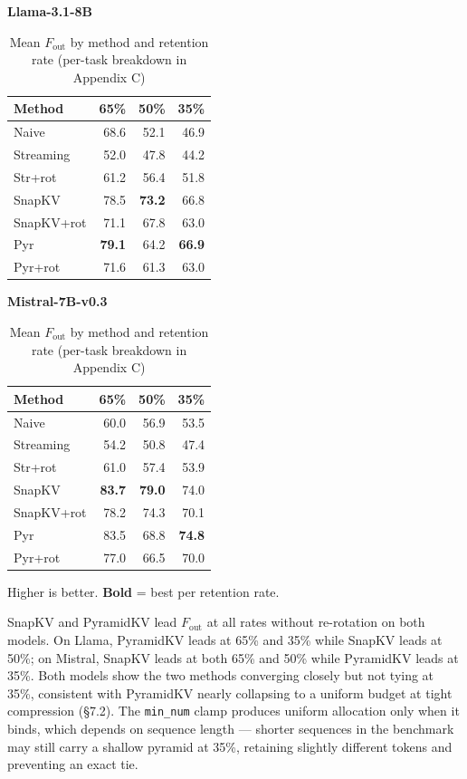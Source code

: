 \documentclass[10pt,letterpaper]{article}
\begin{document}
\begin{table}[H]
\centering
\small
\captionsetup{justification=centering}
\caption{Mean \(F_{\text{out}}\) by method and retention rate (per-task breakdown in Appendix C)}
\label{tab:t4}
\begin{minipage}[t]{0.49\textwidth}
\centering
\textbf{Llama-3.1-8B}\\[0.4em]
\begin{tabular}{@{}lrrr@{}}
\toprule
Method & 65\% & 50\% & 35\%\\
\midrule
Naive      & 68.6 & 52.1 & 46.9\\
Streaming  & 52.0 & 47.8 & 44.2\\
Str+rot    & 61.2 & 56.4 & 51.8\\
SnapKV     & 78.5 & \textbf{73.2} & 66.8\\
SnapKV+rot & 71.1 & 67.8 & 63.0\\
Pyr        & \textbf{79.1} & 64.2 & \textbf{66.9}\\
Pyr+rot    & 71.6 & 61.3 & 63.0\\
\bottomrule
\end{tabular}
\end{minipage}%
\hfill
\begin{minipage}[t]{0.49\textwidth}
\centering
\textbf{Mistral-7B-v0.3}\\[0.4em]
\begin{tabular}{@{}lrrr@{}}
\toprule
Method & 65\% & 50\% & 35\%\\
\midrule
Naive      & 60.0 & 56.9 & 53.5\\
Streaming  & 54.2 & 50.8 & 47.4\\
Str+rot    & 61.0 & 57.4 & 53.9\\
SnapKV     & \textbf{83.7} & \textbf{79.0} & 74.0\\
SnapKV+rot & 78.2 & 74.3 & 70.1\\
Pyr        & 83.5 & 68.8 & \textbf{74.8}\\
Pyr+rot    & 77.0 & 66.5 & 70.0\\
\bottomrule
\end{tabular}
\end{minipage}
\center Higher is better. \textbf{Bold} = best per retention rate.
\end{table}

SnapKV and PyramidKV lead \(F_{\text{out}}\) at all rates without
re-rotation on both models. On Llama,
PyramidKV leads at 65\% and 35\% while SnapKV leads at 50\%; on Mistral,
SnapKV leads at both 65\% and 50\% while PyramidKV leads at 35\%. Both
models show the two methods converging closely but not tying at 35\%,
consistent with PyramidKV nearly collapsing to a uniform budget at tight
compression (§7.2). The \texttt{min\_num} clamp produces uniform
allocation only when it binds, which depends on sequence length ---
shorter sequences in the benchmark may still carry a shallow pyramid at
35\%, retaining slightly different tokens and preventing an exact tie.
\end{document}
